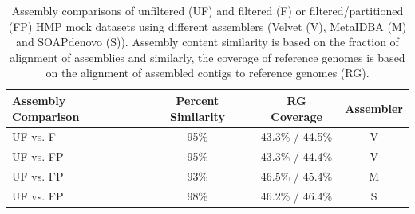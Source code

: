\documentclass{nature}%
\begin{document}
\begin{table}[h]
\caption{Assembly summary statistics (total contigs, total million bp
  assembly length, maximum contig size bp) of unfiltered (UF) and
  filtered (F) or filtered/partitioned (FP) datasets with Velvet (V)
  assembler.  Assembly for UF and FP datasets also shown for MetaIDBA
  (M) and SOAPdenovo(S) assemblers.  Iowa corn and prairie metagenomes
  could not be completed on unfiltered datasets.}
\label{assembly-summary}
\end{table}

\newpage

\begin{table}[h]
\caption{Assembly comparisons of unfiltered (UF) and filtered (F) or
  filtered/partitioned (FP) HMP mock datasets using different
  assemblers (Velvet (V), MetaIDBA (M) and SOAPdenovo (S)).  Assembly
  content similarity is based on the fraction of alignment of
  assemblies and similarly, the coverage of reference genomes is based
  on the alignment of assembled contigs to reference genomes (RG).}
\begin{tabular}{l c c c}
Assembly Comparison & Percent Similarity & RG Coverage & Assembler \\
\hline
UF vs. F & 95\% & 43.3\% / 44.5\% & V \\
UF vs. FP & 95\% & 43.3\% / 44.4\% & V\\
UF vs. FP & 93\% & 46.5\% / 45.4\% & M\\ 
UF vs. FP & 98\% &  46.2\% / 46.4\% & S\\
\end{tabular}
\label{assembly-compare}
\end{table}
\end{document}
